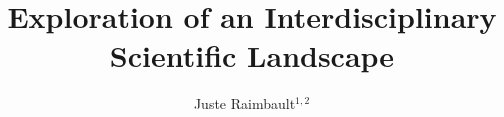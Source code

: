 %
%
%
%
%
%
\RequirePackage{fix-cm}
%
\documentclass[smallextended]{svjour3}       %
%
\smartqed  %
%
\usepackage{graphicx}
%
%
%
%
%




\usepackage{natbib}


% 

\usepackage{amsmath}
\DeclareMathOperator{\Cov}{Cov}
\DeclareMathOperator{\Var}{Var}




\title{Exploration of an Interdisciplinary Scientific Landscape}


\author{Juste Raimbault$^{1,2}$}

